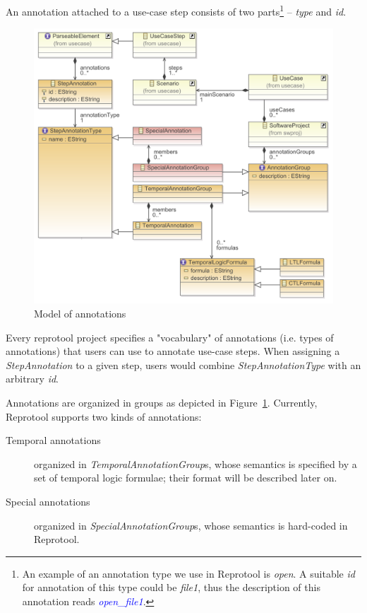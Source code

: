 An annotation attached to a use-case step consists of two parts\footnote{An example of an annotation type we use in Reprotool is \emph{open}.
A suitable \emph{id} for annotation of this type could be \emph{file1}, thus the description of this annotation reads \textcolor{Blue}{\emph{open\_file1}}.}
-- \emph{type} and \emph{id}.

\begin{figure}[ht]
  \centering
  \includegraphics[width=\textwidth]{images/ReprotoolUCAnnotModel}
  \caption{Model of annotations}
  \label{fig:ModelOfAnnotations}
\end{figure}

Every reprotool project specifies a "vocabulary" of annotations (i.e. types of annotations) that users can use to annotate use-case steps. When assigning a \emph{StepAnnotation} to a given step, users would combine \emph{StepAnnotationType} with an arbitrary \emph{id}.

Annotations are organized in groups as depicted in Figure~\ref{fig:ModelOfAnnotations}. Currently, Reprotool supports two kinds of annotations:
\begin{description}

	\item[Temporal annotations] organized in \emph{TemporalAnnotationGroup}s, whose semantics is specified by a set of temporal logic formulae; their format will be described later on.
	
	\item[Special annotations] organized in \emph{SpecialAnnotationGroup}s, whose semantics is hard-coded in Reprotool.
\end{description}

